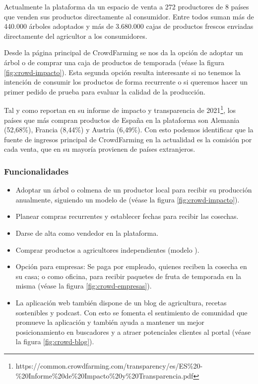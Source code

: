 Actualmente la plataforma da un espacio de venta a 272 productores de 8 países que venden sus productos directamente al consumidor. Entre todos suman más de 440.000 árboles adoptados y más de 3.680.000 cajas de productos frescos enviadas directamente del agricultor a los consumidores.

Desde la página principal de CrowdFarming se nos da la opción de adoptar un árbol o de comprar una caja de productos de temporada (véase la figura \ref{fig:crowd-impacto}). Esta segunda opción resulta interesante si no tenemos la intención de consumir los productos de forma recurrente o si queremos hacer un primer pedido de prueba para evaluar la calidad de la producción.

Tal y como reportan en su informe de impacto y transparencia de 2021\footnote{https://common.crowdfarming.com/transparency/es/ES\%20-\%20Informe\%20de\%20Impacto\%20y\%20Transparencia.pdf}, los países que más compran productos de España en la plataforma son Alemania (52,68\%), Francia (8,44\%) y Austria (6,49\%). Con esto podemos identificar que la fuente de ingresos principal de CrowdFarming en la actualidad es la comisión por cada venta, que en su mayoría provienen de países extranjeros.

\subsubsection{Funcionalidades}

\begin{itemize}

	\item Adoptar un árbol o colmena de un productor local para recibir su producción anualmente, siguiendo un modelo de  (véase la figura \ref{fig:crowd-impacto}).

	\item Planear compras recurrentes y establecer fechas para recibir las cosechas.

	\item Darse de alta como vendedor en la plataforma.

	\item Comprar productos a agricultores independientes (modelo ).

	\item Opción para empresas: Se paga por empleado, quienes reciben la cosecha en su casa; o como oficina, para recibir paquetes de fruta de temporada en la misma (véase la figura \ref{fig:crowd-empresas}).

	\item La aplicación web también dispone de un blog de agricultura, recetas sostenibles y podcast. Con esto se fomenta el sentimiento de comunidad que promueve la aplicación y también ayuda a mantener un mejor posicionamiento en buscadores y a atraer potenciales clientes al portal (véase la figura \ref{fig:crowd-blog}).

\end{itemize}

